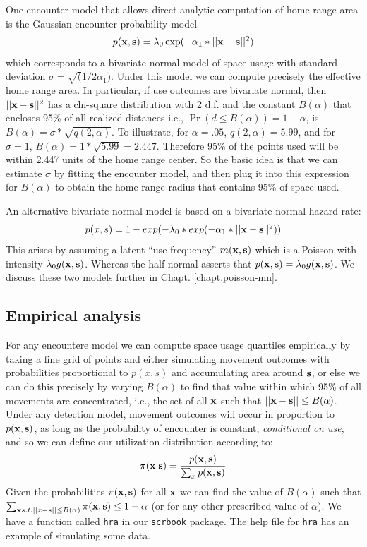 One encounter model that allows direct analytic computation
of home range area is the Gaussian encounter probability model 
\[
p({\bf x},{\bf s}) = \lambda_{0} \exp(-\alpha_{1}*||{\bf x}-{\bf s}||^2)         
\]
which corresponds to a bivariate normal model of space usage with
standard deviation $\sigma = \sqrt(1/2\alpha_{1})$.  Under this model
we can compute precisely the effective home range area. In
particular, if use outcomes are bivariate normal, then 
$||{\bf x}-{\bf  s}||^2$ has a chi-square distribution with 2 d.f. and the constant
$B(\alpha)$ that encloses 95\% of all realized distances i.e.,
$\Pr(d\le B(\alpha)) = 1-\alpha$, is $B(\alpha) =
\sigma*\sqrt{q(2,\alpha)}$.  To illustrate, for $\alpha=.05$,
$q(2,\alpha) = 5.99$, and 
for $\sigma=1$, $B(\alpha) = 1*\sqrt{5.99} = 2.447$. 
Therefore 95\% of the points used will be within 2.447 units of the
home range center. So the basic idea is that we can estimate $\sigma$
by fitting the encounter model, and then plug it into this
expression for $B(\alpha)$ to obtain the home range radius that
contains 95\% of space used.

An alternative bivariate normal model is based on a bivariate normal hazard rate:
\begin{equation}
p(x,s) = 1-exp(-\lambda_{0}*exp(-\alpha_{1}*||{\bf x}-{\bf s}||^2))
\label{scr0.eq.hazard}
\end{equation}
This arises by assuming a latent ``use frequency'' $m({\bf x},{\bf
  s})$ which is a Poisson with intensity $\lambda_0 g({\bf x},{\bf
  s})$. Whereas the half normal asserts that $p({\bf x},{\bf s}) =
\lambda_0 g({\bf x},{\bf s})$.  We discuss these two models further in
Chapt. \ref{chapt.poisson-mn}.

\subsection{Empirical analysis}

For any encountere model we can compute space usage quantiles
empirically by taking a fine grid of points and either simulating
movement outcomes with probabilities proportional to $p(x,s)$ and
accumulating area around ${\bf s}$, or else we can do this precisely
by varying $B(\alpha)$ to find that value within which 95\% of all
movements are concentrated, i.e., the set of all ${\bf x}$ such that
$||{\bf x}-{\bf s}|| \le B(\alpha)$.  Under any detection model,
  movement outcomes will occur in proportion to $p({\bf x},{\bf s})$,
  as long as the probability of encounter is constant, {\it
    conditional on use}, and so we can define our utilization
  distribution according to:
\[
 \pi({\bf x}|{\bf s}) =\frac{p({\bf x},{\bf s})}{\sum_{x} p({\bf
     x},{\bf s}) }
\]
Given the probabilities $\pi({\bf x},{\bf s})$ for all ${\bf x}$ we
can find the value of $B(\alpha)$ such that $\sum_{{\bf x}
  s.t. ||x-s|| \le B(\alpha) } \pi({\bf x},{\bf s}) \le 1-\alpha$ (or
for any other prescribed value of $\alpha$).  We have a function
called \mbox{\tt hra} in our \mbox{\tt scrbook} package. The help file
for \mbox{\tt hra} has an example of simulating some data.

